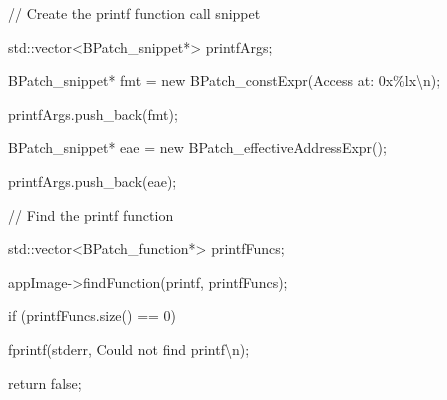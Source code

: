 {{{{{{

}}





\bigskip



{

// Create the printf function call snippet}



{

std::vector<BPatch_snippet*> printfArgs;}



{

BPatch_snippet* fmt = new BPatch_constExpr({\textquotedbl}Access at: 0x\%lx{\textbackslash}n{\textquotedbl});}



{

printfArgs.push_back(fmt);}



{

BPatch_snippet* eae = new BPatch_effectiveAddressExpr();}



{

printfArgs.push_back(eae);}





\bigskip



{

// Find the printf function}



{

std::vector<BPatch_function*> printfFuncs;}



{

appImage->findFunction({\textquotedbl}printf{\textquotedbl}, printfFuncs);}



{

if (printfFuncs.size() == 0) {}



{

fprintf(stderr, {\textquotedbl}Could not find printf{\textbackslash}n{\textquotedbl});}



{

return false;}



{

}}





}}}}
